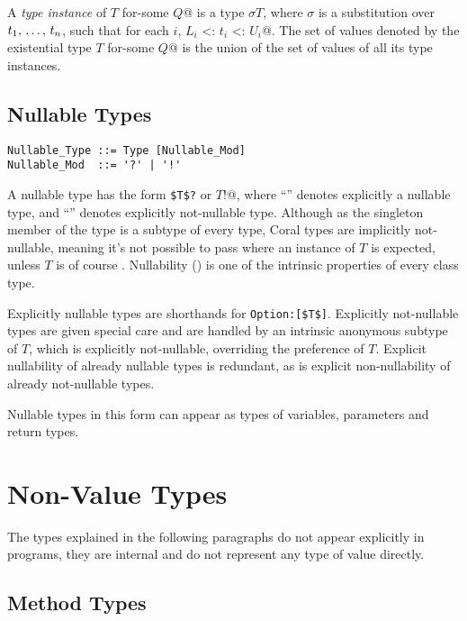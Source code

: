 A {\em type instance} of \lstinline@$T$ for-some {$Q$}@ is a type $\sigma T$, where $\sigma$ is a substitution over $t_1 ,\, \ldots ,\, t_n$, such that for each $i$, \lstinline@$L_i$ <: $t_i$ <: $U_i$@. The set of values denoted by the existential type \lstinline@$T$ for-some {$Q$}@ is the union of the set of values of all its type instances. 

\subsection{Nullable Types}
\label{sec:nullable-types}

\syntax\begin{lstlisting}
Nullable_Type ::= Type [Nullable_Mod]
Nullable_Mod  ::= '?' | '!'
\end{lstlisting}

A nullable type has the form \lstinline!$T$?! or \lstinline@$T$!@, where ``'' denotes explicitly a nullable type, and ``\code{!}'' denotes explicitly not-nullable type. Although  as the singleton member of the  type is a subtype of every type, Coral types are implicitly not-nullable, meaning it's not possible to pass  where an instance of $T$ is expected, unless $T$ is of course . Nullability () is one of the intrinsic properties of every class type. 

Explicitly nullable types are shorthands for \lstinline!Option:[$T$]!. Explicitly not-nullable types are given special care and are handled by an intrinsic anonymous subtype of $T$, which is explicitly not-nullable, overriding the preference of $T$. Explicit nullability of already nullable types is redundant, as is explicit non-nullability of already not-nullable types. 

Nullable types in this form can appear as types of variables, parameters and return types. 

\section{Non-Value Types}

The types explained in the following paragraphs do not appear explicitly in programs, they are internal and do not represent any type of value directly. 

\subsection{Method Types}
\label{sec:method-types}

